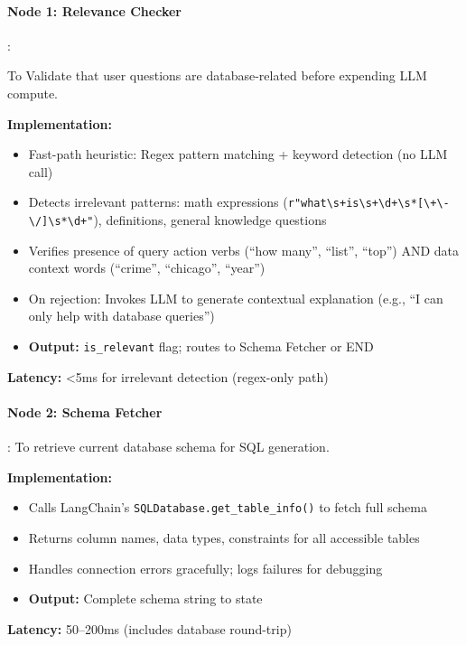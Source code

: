 \documentclass{article}
\begin{document}
\paragraph{Node 1: Relevance Checker}:

To Validate that user questions are database-related before expending LLM compute.

\noindent\textbf{Implementation:}

\begin{itemize}
  \item Fast-path heuristic: Regex pattern matching + keyword detection (no LLM call)
  \item Detects irrelevant patterns: math expressions (\texttt{r"what\textbackslash s+is\textbackslash s+\textbackslash d+\textbackslash s*[\textbackslash +\textbackslash -\textbackslash */]\textbackslash s*\textbackslash d+"}), definitions, general knowledge questions
  \item Verifies presence of query action verbs (``how many'', ``list'', ``top'') AND data context words (``crime'', ``chicago'', ``year'')
  \item On rejection: Invokes LLM to generate contextual explanation (e.g., ``I can only help with database queries'')
  \item \textbf{Output:} \texttt{is\_relevant} flag; routes to Schema Fetcher or END
\end{itemize}

\textbf{Latency:} <5ms for irrelevant detection (regex-only path)

\paragraph{Node 2: Schema Fetcher}: To retrieve current database schema for SQL generation.

\noindent\textbf{Implementation:}

\begin{itemize}
  \item Calls LangChain's \texttt{SQLDatabase.get\_table\_info()} to fetch full schema
  \item Returns column names, data types, constraints for all accessible tables
  \item Handles connection errors gracefully; logs failures for debugging
  \item \textbf{Output:} Complete schema string to state
\end{itemize}

\textbf{Latency:} 50--200ms (includes database round-trip)
\end{document}
